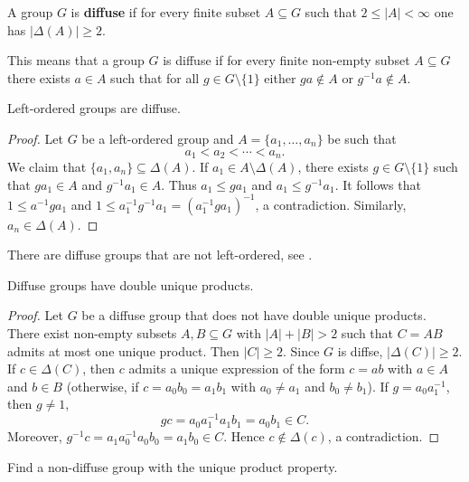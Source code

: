\begin{definition}
	A group $G$ is \textbf{diffuse} if for every finite subset $A\subseteq
	G$ such that $2\leq |A|<\infty$ one has $|\Delta(A)|\geq2$.
\end{definition}

This means that a group $G$ is diffuse if for every finite non-empty subset $A\subseteq G$ there exists 
$a\in A$ such that for all $g\in G\setminus\{1\}$ either $ga\not\in A$ or $g^{-1}a\not\in A$. 

\begin{proposition}
	Left-ordered groups are diffuse.	
\end{proposition}

\begin{proof}
    Let $G$ be a left-ordered group and $A=\{a_1,\dots,a_n\}$ be such that
    \[
    a_1<a_2<\cdots<a_n.
    \]
    We claim that 
	$\{a_1,a_n\}\subseteq\Delta(A)$. If $a_1\in
	A\setminus\Delta(A)$, there exists $g\in G\setminus\{1\}$ such that $ga_1\in A$ and
	$g^{-1}a_1\in A$. Thus  $a_1\leq ga_1$ and $a_1\leq g^{-1}a_1$. It follows that
	$1\leq a^{-1}ga_1$ and $1\leq a_1^{-1}g^{-1}a_1=(a_1^{-1}ga_1)^{-1}$, 
	a contradiction. Similarly, $a_n\in \Delta(A)$.
\end{proof}

There are diffuse groups that are not left-ordered, see
\cite{MR3548136}. 

\begin{proposition}
	\label{pro:difuso=>2up}
    Diffuse groups have double unique products.  
\end{proposition}

\begin{proof}
    Let $G$ be a diffuse group that does not have double unique products. 
    There exist non-empty subsets $A,B\subseteq G$ with $|A|+|B|>2$ such that 
	$C=AB$ admits at most one unique product. Then $|C|\geq2$. Since $G$ is diffse, 
	$|\Delta(C)|\geq2$. If $c\in\Delta(C)$, then $c$ admits a unique 
	expression of the form $c=ab$ with $a\in A$ and $b\in B$ (otherwise, if 
	$c=a_0b_0=a_1b_1$ with $a_0\ne a_1$ and $b_0\ne b_1$). If $g=a_0a_1^{-1}$,
	then $g\ne 1$, 
	\[
	gc=a_0a_1^{-1}a_1b_1=a_0b_1\in C.
	\]
	Moreover, 
	$g^{-1}c=a_1a_0^{-1}a_0b_0=a_1b_0\in C$. Hence $c\not\in\Delta(c)$, a contradiction.
\end{proof}

\begin{problem}
	Find a non-diffuse group with the unique product property.
\end{problem}

